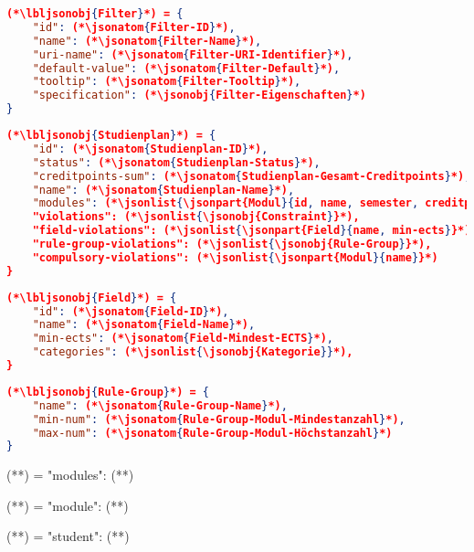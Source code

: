 \begin{lstlisting}[language=json]
(*\lbljsonobj{Filter}*) = {
	"id": (*\jsonatom{Filter-ID}*),
	"name": (*\jsonatom{Filter-Name}*),
	"uri-name": (*\jsonatom{Filter-URI-Identifier}*),
	"default-value": (*\jsonatom{Filter-Default}*),
	"tooltip": (*\jsonatom{Filter-Tooltip}*),
	"specification": (*\jsonobj{Filter-Eigenschaften}*)
}
\end{lstlisting}


\begin{lstlisting}[language=json]
(*\lbljsonobj{Studienplan}*) = {
	"id": (*\jsonatom{Studienplan-ID}*),
	"status": (*\jsonatom{Studienplan-Status}*),
	"creditpoints-sum": (*\jsonatom{Studienplan-Gesamt-Creditpoints}*),
	"name": (*\jsonatom{Studienplan-Name}*),
	"modules": (*\jsonlist{\jsonpart{Modul}{id, name, semester, creditpoints, cycle-type, lecturer, preference}}*),
	"violations": (*\jsonlist{\jsonobj{Constraint}}*),
	"field-violations": (*\jsonlist{\jsonpart{Field}{name, min-ects}}*),
	"rule-group-violations": (*\jsonlist{\jsonobj{Rule-Group}}*),
	"compulsory-violations": (*\jsonlist{\jsonpart{Modul}{name}}*)
}
\end{lstlisting}

\begin{lstlisting}[language=json]
(*\lbljsonobj{Field}*) = {
	"id": (*\jsonatom{Field-ID}*),
	"name": (*\jsonatom{Field-Name}*),
	"min-ects": (*\jsonatom{Field-Mindest-ECTS}*),
	"categories": (*\jsonlist{\jsonobj{Kategorie}}*),
}
\end{lstlisting}

\begin{lstlisting}[language=json]
(*\lbljsonobj{Rule-Group}*) = {
	"name": (*\jsonatom{Rule-Group-Name}*),
	"min-num": (*\jsonatom{Rule-Group-Modul-Mindestanzahl}*),
	"max-num": (*\jsonatom{Rule-Group-Modul-Höchstanzahl}*)
}
\end{lstlisting}

\begin{json}
(**) = {
	"modules": (**)
}	
\end{json}

\begin{json}
(**) = {
	"module": (**)
}	
\end{json}

\begin{json}
(**) = {
	"student": (**)
}	
\end{json}

